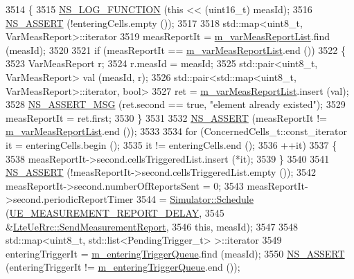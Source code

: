 \begin{DoxyCode}
3514 \{
3515   \hyperlink{log-macros-disabled_8h_a90b90d5bad1f39cb1b64923ea94c0761}{NS\_LOG\_FUNCTION} (\textcolor{keyword}{this} << (uint16\_t) measId);
3516   \hyperlink{assert_8h_a6dccdb0de9b252f60088ce281c49d052}{NS\_ASSERT} (!enteringCells.empty ());
3517 
3518   std::map<uint8\_t, VarMeasReport>::iterator
3519     measReportIt = \hyperlink{classns3_1_1LteUeRrc_a82da3c138c967761910c02b83724a0e4}{m\_varMeasReportList}.find (measId);
3520 
3521   \textcolor{keywordflow}{if} (measReportIt == \hyperlink{classns3_1_1LteUeRrc_a82da3c138c967761910c02b83724a0e4}{m\_varMeasReportList}.end ())
3522     \{
3523       VarMeasReport r;
3524       r.measId = measId;
3525       std::pair<uint8\_t, VarMeasReport> val (measId, r);
3526       std::pair<std::map<uint8\_t, VarMeasReport>::iterator, \textcolor{keywordtype}{bool}>
3527         ret = \hyperlink{classns3_1_1LteUeRrc_a82da3c138c967761910c02b83724a0e4}{m\_varMeasReportList}.insert (val);
3528       \hyperlink{assert_8h_aff5ece9066c74e681e74999856f08539}{NS\_ASSERT\_MSG} (ret.second == \textcolor{keyword}{true}, \textcolor{stringliteral}{"element already existed"});
3529       measReportIt = ret.first;
3530     \}
3531 
3532   \hyperlink{assert_8h_a6dccdb0de9b252f60088ce281c49d052}{NS\_ASSERT} (measReportIt != \hyperlink{classns3_1_1LteUeRrc_a82da3c138c967761910c02b83724a0e4}{m\_varMeasReportList}.end ());
3533 
3534   \textcolor{keywordflow}{for} (ConcernedCells\_t::const\_iterator it = enteringCells.begin ();
3535        it != enteringCells.end ();
3536        ++it)
3537     \{
3538       measReportIt->second.cellsTriggeredList.insert (*it);
3539     \}
3540 
3541   \hyperlink{assert_8h_a6dccdb0de9b252f60088ce281c49d052}{NS\_ASSERT} (!measReportIt->second.cellsTriggeredList.empty ());
3542   measReportIt->second.numberOfReportsSent = 0;
3543   measReportIt->second.periodicReportTimer
3544     = \hyperlink{classns3_1_1Simulator_a671882c894a08af4a5e91181bf1eec13}{Simulator::Schedule} (\hyperlink{namespacens3_a3b1e0ebbbc32a13ed008f61cafe1e9c8}{UE\_MEASUREMENT\_REPORT\_DELAY},
3545                            &\hyperlink{classns3_1_1LteUeRrc_a053ea56e705de39c3531ec0a393c084d}{LteUeRrc::SendMeasurementReport},
3546                            \textcolor{keyword}{this}, measId);
3547 
3548   std::map<uint8\_t, std::list<PendingTrigger\_t> >::iterator
3549     enteringTriggerIt = \hyperlink{classns3_1_1LteUeRrc_a06a26d8b08a9c635d7fa6ff8381fff4f}{m\_enteringTriggerQueue}.find (measId);
3550   \hyperlink{assert_8h_a6dccdb0de9b252f60088ce281c49d052}{NS\_ASSERT} (enteringTriggerIt != \hyperlink{classns3_1_1LteUeRrc_a06a26d8b08a9c635d7fa6ff8381fff4f}{m\_enteringTriggerQueue}.end ());

\end{DoxyCode}
